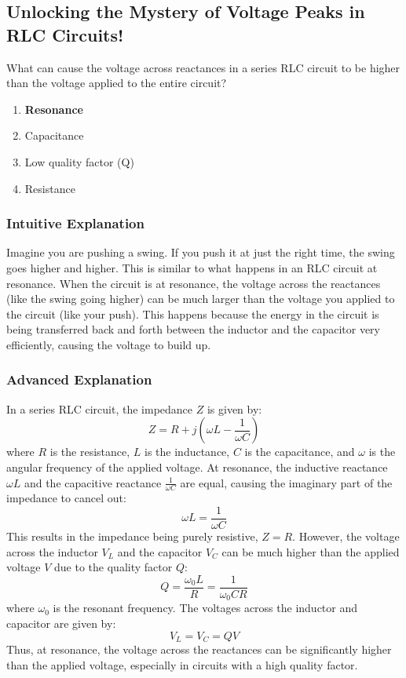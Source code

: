 \subsection{Unlocking the Mystery of Voltage Peaks in RLC Circuits!}

\begin{tcolorbox}[colback=gray!10!white,colframe=black!75!black,title=E5A01] What can cause the voltage across reactances in a series RLC circuit to be higher than the voltage applied to the entire circuit?
    \begin{enumerate}[label=\Alph*.]
        \item \textbf{Resonance}
        \item Capacitance
        \item Low quality factor (Q)
        \item Resistance
    \end{enumerate}
\end{tcolorbox}

\subsubsection{Intuitive Explanation}
Imagine you are pushing a swing. If you push it at just the right time, the swing goes higher and higher. This is similar to what happens in an RLC circuit at resonance. When the circuit is at resonance, the voltage across the reactances (like the swing going higher) can be much larger than the voltage you applied to the circuit (like your push). This happens because the energy in the circuit is being transferred back and forth between the inductor and the capacitor very efficiently, causing the voltage to build up.

\subsubsection{Advanced Explanation}
In a series RLC circuit, the impedance \( Z \) is given by:
\[
Z = R + j\left(\omega L - \frac{1}{\omega C}\right)
\]
where \( R \) is the resistance, \( L \) is the inductance, \( C \) is the capacitance, and \( \omega \) is the angular frequency of the applied voltage. At resonance, the inductive reactance \( \omega L \) and the capacitive reactance \( \frac{1}{\omega C} \) are equal, causing the imaginary part of the impedance to cancel out:
\[
\omega L = \frac{1}{\omega C}
\]
This results in the impedance being purely resistive, \( Z = R \). However, the voltage across the inductor \( V_L \) and the capacitor \( V_C \) can be much higher than the applied voltage \( V \) due to the quality factor \( Q \):
\[
Q = \frac{\omega_0 L}{R} = \frac{1}{\omega_0 C R}
\]
where \( \omega_0 \) is the resonant frequency. The voltages across the inductor and capacitor are given by:
\[
V_L = V_C = QV
\]
Thus, at resonance, the voltage across the reactances can be significantly higher than the applied voltage, especially in circuits with a high quality factor.

